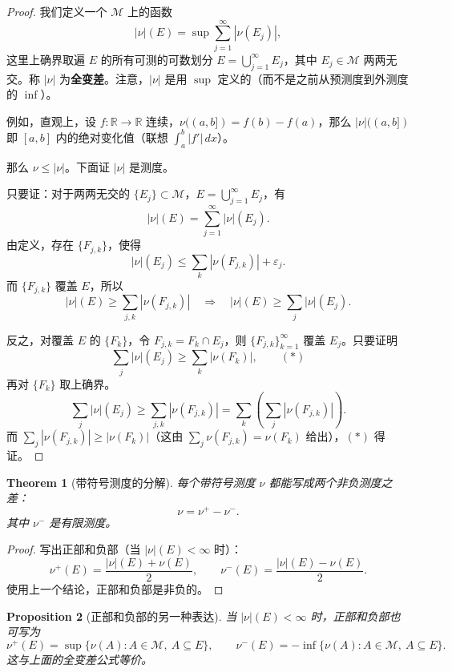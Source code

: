 \documentclass[12pt,letterpaper,twoside,openright]{ctexbook}
\theoremstyle{bluehead}
\newtheorem{theorem}{Theorem}
\newtheorem{proposition}[theorem]{Proposition}
\theoremstyle{olivehead}
\theoremstyle{orangehead}
\theoremstyle{redremark}
\begin{document}
\begin{proof}
我们定义一个 $\mathcal M$ 上的函数
\[
|\nu|(E)=\sup\sum_{j=1}^{\infty}|\nu(E_j)|,
\]
这里上确界取遍 $E$ 的所有可测的可数划分 $E=\bigcup_{j=1}^{\infty}E_j$，其中 $E_j\in\mathcal M$ 两两无交。称 $|\nu|$ 为\textbf{全变差}。注意，$|\nu|$ 是用 $\sup$ 定义的（而不是之前从预测度到外测度的 $\inf$）。

例如，直观上，设 $f:\mathbb R\to\mathbb R$ 连续，$\nu((a,b])=f(b)-f(a)$，那么 $|\nu|((a,b])$ 即 $[a,b]$ 内的绝对变化值（联想 $\int_a^b|f'|\,dx$）。

那么 $\nu\leq|\nu|$。下面证 $|\nu|$ 是测度。

只要证：对于两两无交的 $\{E_j\}\subset\mathcal M$，$E=\bigcup_{j=1}^{\infty}E_j$，有
\[
|\nu|(E)=\sum_{j=1}^{\infty}|\nu|(E_j).
\]
由定义，存在 $\{F_{j,k}\}$，使得
\[
|\nu|(E_j)\leq\sum_k|\nu(F_{j,k})|+\varepsilon_j.
\]
而 $\{F_{j,k}\}$ 覆盖 $E$，所以
\[
|\nu|(E)\geq\sum_{j,k}|\nu(F_{j,k})|
\quad\Longrightarrow\quad
|\nu|(E)\geq\sum_j|\nu|(E_j).
\]

反之，对覆盖 $E$ 的 $\{F_k\}$，令 $F_{j,k}=F_k\cap E_j$，则 $\{F_{j,k}\}_{k=1}^{\infty}$ 覆盖 $E_j$。只要证明
\[
\sum_j|\nu|(E_j)\geq\sum_k|\nu(F_k)|,\qquad(*)
\]
再对 $\{F_k\}$ 取上确界。
\[
\sum_j|\nu|(E_j)
\geq\sum_{j,k}|\nu(F_{j,k})|
=\sum_k\left(\sum_j|\nu(F_{j,k})|\right).
\]
而 $\sum_j|\nu(F_{j,k})|\geq|\nu(F_k)|$（这由 $\sum_j\nu(F_{j,k})=\nu(F_k)$ 给出），$(*)$ 得证。
\end{proof}
\begin{theorem}[带符号测度的分解]
每个带符号测度 $\nu$ 都能写成两个非负测度之差：
\[
\nu=\nu^+-\nu^-.
\]
其中 $\nu^-$ 是有限测度。
\end{theorem}

\begin{proof}
写出正部和负部（当 $|\nu|(E)<\infty$ 时）：
\[
\nu^+(E)=\frac{|\nu|(E)+\nu(E)}2,
\qquad
\nu^-(E)=\frac{|\nu|(E)-\nu(E)}2.
\]
使用上一个结论，正部和负部是非负的。
\end{proof}

\begin{proposition}[正部和负部的另一种表达]
当 $|\nu|(E)<\infty$ 时，正部和负部也可写为
\[
\nu^+(E)=\sup\{\nu(A):A\in\mathcal M,\ A\subseteq E\},
\qquad
\nu^-(E)=-\inf\{\nu(A):A\in\mathcal M,\ A\subseteq E\}.
\]
这与上面的全变差公式等价。
\end{proposition}
\end{document}
